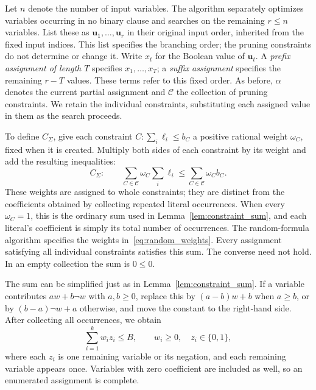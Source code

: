 \documentclass[11pt,a4paper]{article}
\theoremstyle{definition}
\theoremstyle{remark}
\newcommand{\bits}{\{0,1\}}
\begin{document}
Let $n$ denote the number of input variables. The algorithm separately
optimizes variables occurring in no binary clause and searches on the
remaining $r\le n$ variables. List these as
$\mathbf u_1,\ldots,\mathbf u_r$ in their original input order, inherited
from the fixed input indices. This list
specifies the branching order; the pruning constraints do not determine
or change it. Write $x_t$ for the Boolean value of $\mathbf u_t$.
A \emph{prefix assignment of length $T$} specifies
$x_1,\ldots,x_T$; a \emph{suffix assignment} specifies the remaining
$r-T$ values. These terms refer to this fixed order.
As before, $\alpha$ denotes the current partial assignment and $\mathcal C$
the collection of pruning constraints. We retain the individual constraints,
substituting each assigned value in them as the search proceeds.

To define $C_\Sigma$, give each constraint $C:\sum_i\ell_i\le b_C$ a
positive rational weight $\omega_C$, fixed when it is created. Multiply
both sides of each constraint by its weight and add the resulting
inequalities:
\begin{equation}
 C_\Sigma:\qquad
 \sum_{C\in\mathcal C}\omega_C\sum_i\ell_i
 \le \sum_{C\in\mathcal C}\omega_C b_C .
\label{eq:weighted}
\end{equation}
These weights are assigned to whole constraints; they are distinct from
the coefficients obtained by collecting repeated literal occurrences.
When every $\omega_C=1$, this is the ordinary sum used in
Lemma~\ref{lem:constraint_sum}, and each literal's coefficient is simply
its total number of occurrences. The random-formula algorithm specifies
the weights in~\eqref{eq:random_weights}.
Every assignment satisfying all individual constraints satisfies this sum.
The converse need not hold. In an empty collection the sum is $0\le0$.

The sum can be simplified just as in Lemma~\ref{lem:constraint_sum}.
If a variable contributes $aw+b\neg w$ with $a,b\ge0$, replace this by
$(a-b)w+b$ when $a\ge b$, or by $(b-a)\neg w+a$ otherwise, and move the
constant to the right-hand side. After collecting all occurrences, we obtain
\begin{equation}
 \sum_{i=1}^k w_i z_i\le B,\qquad w_i\ge0,\quad z_i\in\bits,
 \label{eq:budget}
\end{equation}
where each $z_i$ is one remaining variable or its negation, and each
remaining variable appears once. Variables with zero coefficient are
included as well, so an enumerated assignment is complete.
\end{document}
